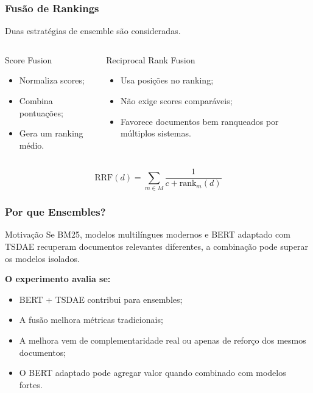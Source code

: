 \documentclass[aspectratio=169]{beamer}
\begin{document}
\begin{frame}
\frametitle{Fusão de Rankings}

Duas estratégias de ensemble são consideradas.

\vspace{0.25cm}

\begin{columns}

\begin{block}{Score Fusion}
\begin{itemize}
  \item Normaliza scores;
  \item Combina pontuações;
  \item Gera um ranking médio.
\end{itemize}
\end{block}

\begin{block}{Reciprocal Rank Fusion}
\begin{itemize}
  \item Usa posições no ranking;
  \item Não exige scores comparáveis;
  \item Favorece documentos bem ranqueados por múltiplos sistemas.
\end{itemize}
\end{block}

\end{columns}

\vspace{0.25cm}

\[
\text{RRF}(d) = \sum_{m \in M} \frac{1}{c + \text{rank}_m(d)}
\]

\end{frame}

\begin{frame}
\frametitle{Por que Ensembles?}

\begin{block}{Motivação}
Se BM25, modelos multilíngues modernos e BERT adaptado com TSDAE recuperam documentos relevantes diferentes, a combinação pode superar os modelos isolados.
\end{block}

\vspace{0.25cm}

\textbf{O experimento avalia se:}

\begin{itemize}
  \item BERT + TSDAE contribui para ensembles;
  \item A fusão melhora métricas tradicionais;
  \item A melhora vem de complementaridade real ou apenas de reforço dos mesmos documentos;
  \item O BERT adaptado pode agregar valor quando combinado com modelos fortes.
\end{itemize}

\end{frame}
\end{document}
